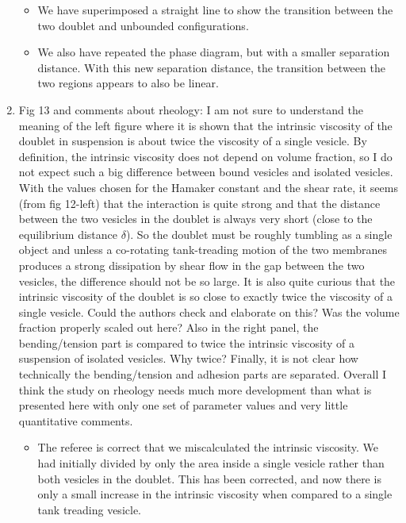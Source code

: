 \documentclass[11pt]{article}
\newcommand{\comment}[1]{{\color{blue} #1}}
\begin{document}
\begin{enumerate}
\begin{itemize}
  \item We have superimposed a straight line to show the transition
    between the two doublet and unbounded configurations.

  \item We also have repeated the phase diagram, but with a smaller
    separation distance.  With this new separation distance, the
    transition between the two regions appears to also be linear.
\end{itemize}

\item\comment{Fig 13 and comments about rheology: I am not sure to
  understand the meaning of the left figure where it is shown that the
  intrinsic viscosity of the doublet in suspension is about twice the
  viscosity of a single vesicle. By definition, the intrinsic viscosity
  does not depend on volume fraction, so I do not expect such a big
  difference between bound vesicles and isolated vesicles. With the
  values chosen for the Hamaker constant and the shear rate, it seems
  (from fig 12-left) that the interaction is quite strong and that the
  distance between the two vesicles in the doublet is always very short
  (close to the equilibrium distance $\delta$). So the doublet must be
  roughly tumbling as a single object and unless a co-rotating
  tank-treading motion of the two membranes produces a strong
  dissipation by shear flow in the gap between the two vesicles, the
  difference should not be so large. It is also quite curious that the
  intrinsic viscosity of the doublet is so close to exactly twice the
  viscosity of a single vesicle. Could the authors check and elaborate
  on this? Was the volume fraction properly scaled out here? Also in the
  right panel, the bending/tension part is compared to twice the
  intrinsic viscosity of a suspension of isolated vesicles. Why twice?
  Finally, it is not clear how technically the bending/tension and
  adhesion parts are separated.  Overall I think the study on rheology
  needs much more development than what is presented here with only one
  set of parameter values and very little quantitative comments.}
\begin{itemize}
  \item The referee is correct that we miscalculated the intrinsic
    viscosity.  We had initially divided by only the area inside a
    single vesicle rather than both vesicles in the doublet.  This has
    been corrected, and now there is only a small increase in the
    intrinsic viscosity when compared to a single tank treading vesicle.


\end{itemize}
\end{enumerate}
\end{document}
